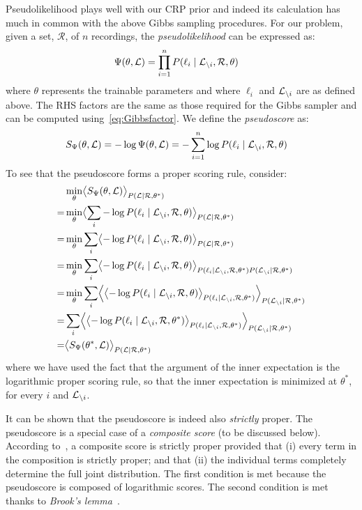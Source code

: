\documentclass[a4paper,oneside,12pt,english]{report}
\def\expv#1#2{\bigl\langle#1\bigr\rangle_{#2}}
\def\Expv#1#2{\Bigl\langle#1\Bigr\rangle_{#2}}
\def\Lset{\mathcal{L}}
\def\Rset{\mathcal{R}}
\begin{document}
Pseudolikelihood plays well with our CRP prior and indeed its calculation has much in common with the above Gibbs sampling procedures. For our problem, given a set, $\Rset$, of $n$ recordings, the \emph{pseudolikelihood} can be expressed as:
\begin{align}
\label{eq:Psi}
\Psi(\theta,\Lset) &= \prod_{i=1}^n P(\ell_i\mid \Li, \Rset,\theta)
\end{align} 
where $\theta$ represents the trainable parameters and where $\ell_i$ and $\Li$ are as defined above. The RHS factors are the same as those required for the Gibbs sampler and can be computed using~\eqref{eq:Gibbsfactor}. We define the \emph{pseudoscore} as:
\begin{align}
S_\Psi(\theta,\Lset) &= -\log \Psi(\theta,\Lset) = -\sum_{i=1}^n \log P(\ell_i\mid \Li, \Rset,\theta)
\end{align} 
To see that the pseudoscore forms a proper scoring rule, consider:
\begin{align}
\begin{split}
&\min_\theta\expv{S_\Psi(\theta,\Lset)}{P(\Lset\mid\Rset,\theta^*)}\\
=& \min_\theta\expv{\sum_i-\log P(\ell_i\mid \Li, \Rset,\theta)}{P(\Lset\mid\Rset,\theta^*)}\\
=& \min_\theta\sum_i\expv{-\log P(\ell_i\mid \Li, \Rset,\theta)}{P(\Lset\mid\Rset,\theta^*)}\\
=& \min_\theta\sum_i\expv{-\log P(\ell_i\mid \Li, \Rset,\theta)}{P(\ell_i\mid \Li, \Rset,\theta^*)P(\Li\mid\Rset,\theta^*)}\\
=& \min_\theta\sum_i\Expv{\expv{-\log P(\ell_i\mid \Li, \Rset,\theta)}{P(\ell_i\mid \Li, \Rset,\theta^*)}}{P(\Li\mid\Rset,\theta^*)}\\
=& \sum_i\Expv{\expv{-\log P(\ell_i\mid \Li, \Rset,\theta^*)}{P(\ell_i\mid \Li, \Rset,\theta^*)}}{P(\Li\mid\Rset,\theta^*)}\\
=& \expv{S_\Psi(\theta^*,\Lset)}{P(\Lset\mid\Rset,\theta^*)}
\end{split}
\end{align}
where we have used the fact that the argument of the inner expectation is the logarithmic proper scoring rule, so that the inner expectation is minimized at $\theta^*$, for every $i$ and $\Li$. 

It can be shown that the pseudoscore is indeed also \emph{strictly} proper. The pseudoscore is a special case of a \emph{composite score} (to be discussed below). According to~\cite{Dawid_Musio_ThApp_PSR_2014}, a composite score is strictly proper provided that (i) every term in the composition is strictly proper; and that (ii) the individual terms completely determine the full joint distribution. The first condition is met because the pseudoscore is composed of logarithmic scores. The second condition is met thanks to \emph{Brook's lemma}~\cite{Lyu_BrooksLemma,BrooksLemma}.
\end{document}
